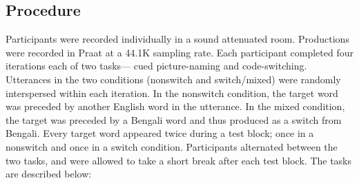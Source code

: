 \documentclass[12 pt]{article}
\begin{document}
\subsection{Procedure} \label{procedure}
Participants were recorded individually in a sound attenuated room. Productions were recorded in Praat \citep{boersma2016praat} at a 44.1K sampling rate. Each participant completed four iterations each of two tasks--- cued picture-naming and code-switching. Utterances in the two conditions (nonswitch and switch/mixed) were randomly interspersed within each iteration. In the nonswitch condition, the target word was preceded by another English word in the utterance. In the mixed condition, the target was preceded by a Bengali word and thus produced as a switch from Bengali. Every target word appeared twice during a test block; once in a nonswitch and once in a switch condition. Participants alternated between the two tasks, and were allowed to take a short break after each test block. The tasks are described below:
\end{document}
